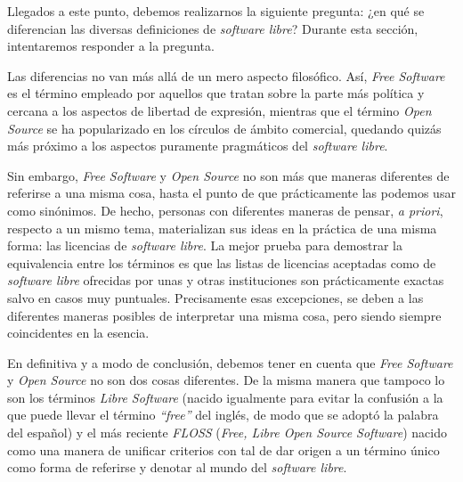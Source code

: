Llegados a este punto, debemos realizarnos la siguiente pregunta: ¿en qué se
diferencian las diversas definiciones de \textit{software libre}? Durante esta
sección, intentaremos responder a la pregunta.

Las diferencias no van más allá de un mero aspecto filosófico. Así, \textit{Free
Software} es el término empleado por aquellos que tratan sobre la parte más
política y cercana a los aspectos de libertad de expresión, mientras que el
término \textit{Open Source} se ha popularizado en los círculos de ámbito
comercial, quedando quizás más próximo a los aspectos puramente pragmáticos del
\textit{software libre}.

Sin embargo, \textit{Free Software} y \textit{Open Source} no son más que
maneras diferentes de referirse a una misma cosa, hasta el punto de que
prácticamente las podemos usar como sinónimos. De hecho, personas con diferentes
maneras de pensar, \textit{a priori}, respecto a un mismo tema, materializan sus
ideas en la práctica de una misma forma: las licencias de \textit{software
libre}. La mejor prueba para demostrar la equivalencia entre los términos es
que las listas de licencias aceptadas como de \textit{software libre} ofrecidas
por unas y otras instituciones son prácticamente exactas salvo en casos muy
puntuales. Precisamente esas excepciones, se deben a las diferentes maneras
posibles de interpretar una misma cosa, pero siendo siempre coincidentes en la
esencia.

En definitiva y a modo de conclusión, debemos tener en cuenta que \textit{Free
Software} y \textit{Open Source} no son dos cosas diferentes. De la misma manera
que tampoco lo son los términos \textit{Libre Software} (nacido igualmente para
evitar la confusión a la que puede llevar el término \textit{``free''} del
inglés, de modo que se adoptó la palabra del español) y el más reciente
\textit{FLOSS} (\textit{Free, Libre Open Source Software}) nacido como una
manera de unificar criterios con tal de dar origen a un término único como
forma de referirse y denotar al mundo del \textit{software libre}.
